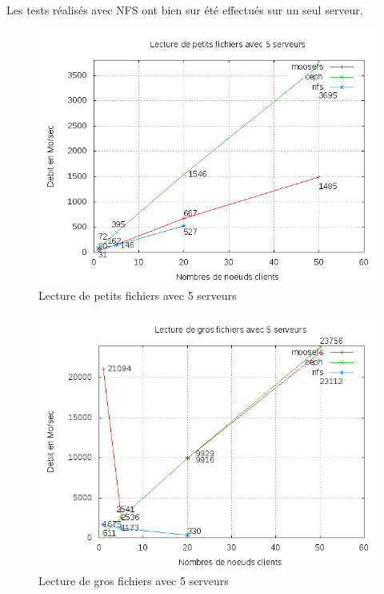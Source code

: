 \documentclass[12pt]{report}
\begin{document}
			Les tests réalisés avec NFS ont bien sur été effectués sur un seul serveur.

\begin{figure}[H]
\begin{center}
\includegraphics[bb=0 0 640 480,width=12cm]{images/srv5rs2.png}
\caption{Lecture de petits fichiers avec 5 serveurs}
\end{center}
\end{figure} 
\begin{figure}[H]
\begin{center}
\includegraphics[bb=0 0 640 480,width=12cm]{images/srv5rb2.png}
\caption{Lecture de gros fichiers avec 5 serveurs}
\end{center}
\end{figure} 
\end{document}
